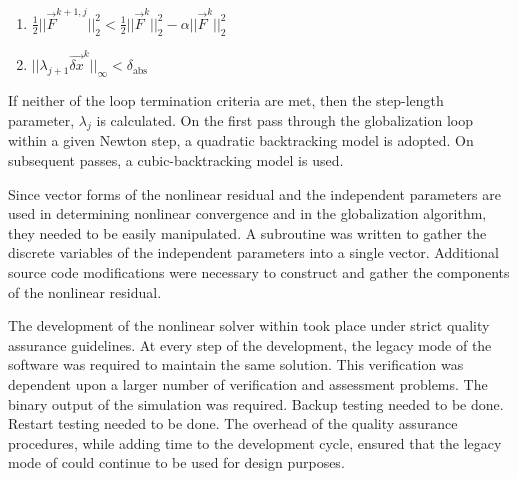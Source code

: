 \begin{enumerate}
\item{$\frac{1}{2}||\vec{F}^{k+1, j}||^{2}_{2} < \frac{1}{2}||\vec{F}^{k}||^{2}_{2} - \alpha ||\vec{F}^{k}||^{2}_{2}$ }
\item{$||\lambda_{j+1} \vec{\delta x}^{k}||_{\infty} < \delta_{\text{abs}}$}
\end{enumerate}

If neither of the loop termination criteria are met, then the step-length parameter, $\lambda_j$ is calculated.
On the first pass through the globalization loop within a given Newton step, a quadratic backtracking model is adopted.
On subsequent passes, a cubic-backtracking model is used.
 
Since vector forms of the nonlinear residual and the independent parameters are used in determining nonlinear convergence and in the globalization algorithm, they needed to be easily manipulated.
A subroutine was written to gather the discrete variables of the independent parameters into a single vector.
Additional source code modifications were necessary to construct and gather the components of the nonlinear residual.

The development of the nonlinear solver within \cobra{} took place under strict quality assurance guidelines.
At every step of the development, the legacy mode of the software was required to maintain the same solution.
This verification was dependent upon a larger number of verification and assessment problems.
The binary output of the simulation was required.
Backup testing needed to be done.
Restart testing needed to be done.
The overhead of the quality assurance procedures, while adding time to the development cycle, ensured that the legacy mode of \cobra{} could continue to be used for design purposes.

